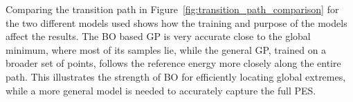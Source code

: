 \documentclass[a4paper, 12pt]{article}
\begin{document}
Comparing the transition path in Figure~\ref{fig:transition_path_comparison} for the two different models used shows how the training and purpose of the models affect the results. The BO based GP is very accurate close to the global minimum, where most of its samples lie, while the general GP, trained on a broader set of points, follows the reference energy more closely along the entire path. This illustrates the strength of BO for efficiently locating global extremes, while a more general model is needed to accurately capture the full PES.
\newpage
\printbibliography
\end{document}
